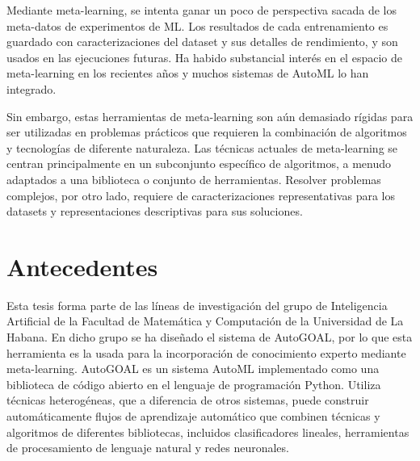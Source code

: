 
Mediante meta-learning, se intenta ganar un poco de perspectiva sacada de los meta-datos de experimentos de ML. Los resultados de cada entrenamiento es guardado con caracterizaciones del dataset y sus detalles de rendimiento, y son usados en las ejecuciones futuras. Ha habido substancial interés en el espacio de meta-learning en los recientes años y muchos sistemas de AutoML lo han integrado.

Sin embargo, estas herramientas de meta-learning son aún demasiado rígidas para ser utilizadas en problemas prácticos que requieren la combinación de algoritmos y tecnologías de diferente naturaleza. Las técnicas actuales de meta-learning se centran principalmente en un subconjunto específico de algoritmos, a menudo adaptados a una biblioteca
o conjunto de herramientas. Resolver problemas complejos, por otro lado, requiere de caracterizaciones representativas para los datasets y representaciones descriptivas para sus soluciones.

\section*{Antecedentes}

Esta tesis forma parte de las líneas de investigación del grupo de Inteligencia Artificial de la Facultad de Matemática y Computación de la Universidad de La Habana. En dicho grupo se ha diseñado el sistema de AutoGOAL,  por lo que esta herramienta es la usada para la incorporación de conocimiento experto mediante meta-learning. AutoGOAL es un sistema AutoML implementado como una biblioteca de código abierto en el lenguaje de programación Python. Utiliza técnicas heterogéneas, que a diferencia de otros sistemas, puede construir automáticamente flujos de aprendizaje automático que combinen técnicas y algoritmos de diferentes bibliotecas, incluidos clasificadores lineales, herramientas de procesamiento de lenguaje natural y redes neuronales.


